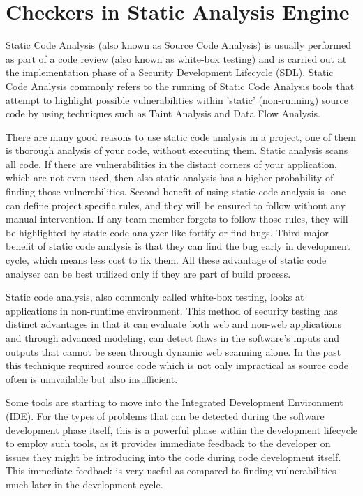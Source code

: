 \section{Checkers in Static Analysis Engine}

Static Code Analysis (also known as Source Code Analysis) is usually performed as part of a code review (also known as white-box testing) and is carried out at the implementation phase of a Security Development Lifecycle (SDL). Static Code Analysis commonly refers to the running of Static Code Analysis tools that attempt to highlight possible vulnerabilities within 'static' (non-running) source code by using techniques such as Taint Analysis and Data Flow Analysis.

There are many good reasons to use static code analysis in a project, one of them is thorough analysis of your code, without executing them. Static analysis scans all code. If there are vulnerabilities in the distant corners of your application, which are not even used, then also static analysis has a higher probability of finding those vulnerabilities. Second benefit of using static code analysis is- one can define project specific rules, and they will be ensured to follow without any manual intervention. If any team member forgets to follow those rules, they will be highlighted by static code analyzer like fortify or find-bugs. Third major benefit of static code analysis is that they can find the bug early in development cycle, which means less cost to fix them. All these advantage of static code analyser can be best utilized only if they are part of build process.

Static code analysis, also commonly called white-box testing, looks at applications in non-runtime environment. This method of security testing has distinct advantages in that it can evaluate both web and non-web applications and through advanced modeling, can detect flaws in the software's inputs and outputs that cannot be seen through dynamic web scanning alone. In the past this technique required source code which is not only impractical as source code often is unavailable but also insufficient.

Some tools are starting to move into the Integrated Development Environment (IDE). For the types of problems that can be detected during the software development phase itself, this is a powerful phase within the development lifecycle to employ such tools, as it provides immediate feedback to the developer on issues they might be introducing into the code during code development itself. This immediate feedback is very useful as compared to finding vulnerabilities much later in the development cycle.


